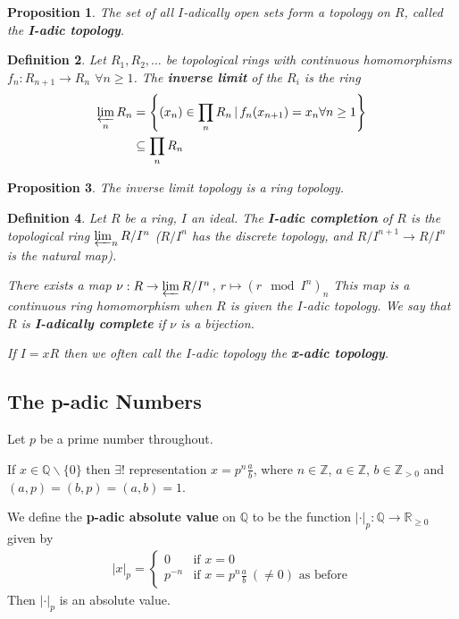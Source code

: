 \documentclass[a4paper]{article}
\newtheorem{definition}{Definition}
\newtheorem{prop}[definition]{Proposition}
\newcommand*\abs[1]{\left|#1\right|}
\begin{document}
\begin{prop}
	The set of all $I$-adically open sets form a topology on $R$, called the \textbf{I-adic topology}.
\end{prop}

\begin{definition}
	Let $R_1, R_2, \dots$ be topological rings with continuous homomorphisms $f_n:R_{n+1}\to R_n$ $\forall n \geq 1$. The \textbf{inverse limit} of the $R_i$ is the ring
	\begin{align*}
		\varprojlim_n R_n &= \left\{(x_n) \in \prod_n R_n \,|\, f_n(x_{n+1})=x_n \forall n \geq 1  \right\}\\
		&\subseteq \prod_n R_n
	\end{align*}
\end{definition}

\begin{prop}
	The inverse limit topology is a ring topology.
\end{prop}

\begin{definition}
	Let $R$ be a ring, $I$ an ideal. The \textbf{I-adic completion} of $R$ is the topological ring $\varprojlim_n R/I^n$ ($R/I^n$ has the discrete topology, and $R/I^{n+1} \to R/I^{n}$ is the natural map).
	
	There exists a map $\nu: R \to \varprojlim R/I^n$, $r \mapsto (r \mod I^n)_n$ This map is a continuous ring homomorphism when $R$ is given the $I$-adic topology. We say that $R$ is \textbf{I-adically complete} if $\nu$ is a bijection.
	
	If $I=xR$ then we often call the $I$-adic topology the \textbf{x-adic topology}.
\end{definition}

\subsection{The p-adic Numbers}
Let $p$ be a prime number throughout.

If $x \in \mathbb{Q} \backslash \{0\}$ then $\exists!$ representation $x=p^n \frac{a}{b}$, where $n \in \mathbb{Z}$, $a \in \mathbb{Z}$, $b \in \mathbb{Z}_{>0}$ and $(a,p)=(b,p)=(a,b)=1$.

We define the \textbf{p-adic absolute value} on $\mathbb{Q}$ to be the function $\abs{\cdot}_p: \mathbb{Q} \to \mathbb{R}_{\geq 0}$ given by
\begin{align*}
	\abs{x}_p =
	\begin{cases}
	0 &\text{if } x=0\\
	p^{-n}  &\text{if } x=p^n \frac{a}{b}\ (\neq 0) \text{ as before}
	\end{cases}
\end{align*}
Then $\abs{\cdot}_p$ is an absolute value.
\end{document}
